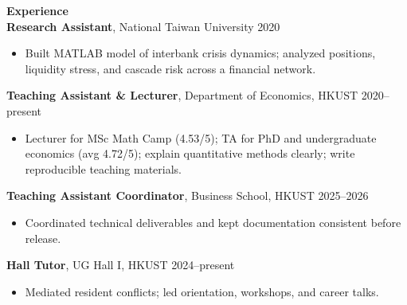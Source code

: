 \documentclass[11pt,letterpaper]{article}
\begin{document}
{\large \textbf{Experience}}\\[-0.5pt]
\textbf{Research Assistant}, National Taiwan University \hfill 2020\\
\vspace{-6pt}
\begin{itemize}
  \item Built MATLAB model of interbank crisis dynamics; analyzed positions, liquidity stress, and cascade risk across a financial network.
\end{itemize}
\textbf{Teaching Assistant \& Lecturer}, Department of Economics, HKUST \hfill 2020--present\\
\vspace{-6pt}
\begin{itemize}
  \item Lecturer for MSc Math Camp (4.53/5); TA for PhD and undergraduate economics (avg 4.72/5); explain quantitative methods clearly; write reproducible teaching materials.
\end{itemize}
\textbf{Teaching Assistant Coordinator}, Business School, HKUST \hfill 2025--2026\\
\vspace{-6pt}
\begin{itemize}
  \item Coordinated technical deliverables and kept documentation consistent before release.
\end{itemize}
\textbf{Hall Tutor}, UG Hall I, HKUST \hfill 2024--present\\
\vspace{-6pt}
\begin{itemize}
  \item Mediated resident conflicts; led orientation, workshops, and career talks.
\end{itemize}

\vspace{0.15pt}
\end{document}
